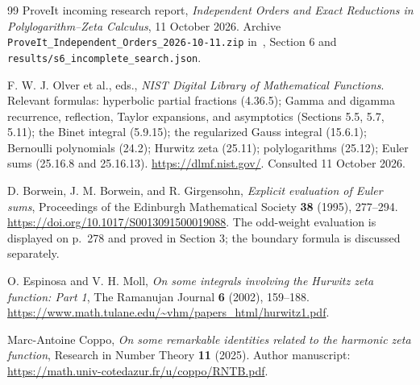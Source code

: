 \documentclass[11pt,a4paper]{article}
\numberwithin{equation}{section}
\theoremstyle{definition}
\theoremstyle{remark}
\begin{document}
\begin{thebibliography}{99}
ProveIt incoming research report,
\emph{Independent Orders and Exact Reductions in
Polylogarithm--Zeta Calculus}, 11 October 2026.
Archive \nolinkurl{ProveIt_Independent_Orders_2026-10-11.zip}
in~\cite{ProveIt}, Section 6 and
\nolinkurl{results/s6_incomplete_search.json}.

F. W. J. Olver et al., eds.,
\emph{NIST Digital Library of Mathematical Functions}.
Relevant formulas: hyperbolic partial fractions (4.36.5);
Gamma and digamma recurrence, reflection, Taylor expansions,
and asymptotics (Sections 5.5, 5.7, 5.11);
the Binet integral (5.9.15); the regularized Gauss integral
(15.6.1); Bernoulli polynomials (24.2);
Hurwitz zeta (25.11); polylogarithms (25.12);
Euler sums (25.16.8 and 25.16.13).
\url{https://dlmf.nist.gov/}. Consulted 11 October 2026.

D. Borwein, J. M. Borwein, and R. Girgensohn,
\emph{Explicit evaluation of Euler sums},
Proceedings of the Edinburgh Mathematical Society \textbf{38}
(1995), 277--294.
\url{https://doi.org/10.1017/S0013091500019088}.
The odd-weight evaluation is displayed on p.~278 and proved in
Section 3; the boundary formula is discussed separately.

O. Espinosa and V. H. Moll,
\emph{On some integrals involving the Hurwitz zeta function:
Part 1}, The Ramanujan Journal \textbf{6} (2002), 159--188.
\url{https://www.math.tulane.edu/~vhm/papers_html/hurwitz1.pdf}.

Marc-Antoine Coppo,
\emph{On some remarkable identities related to the harmonic zeta
function}, Research in Number Theory \textbf{11} (2025).
Author manuscript:
\url{https://math.univ-cotedazur.fr/u/coppo/RNTB.pdf}.



\end{thebibliography}
\endgroup
\end{document}
